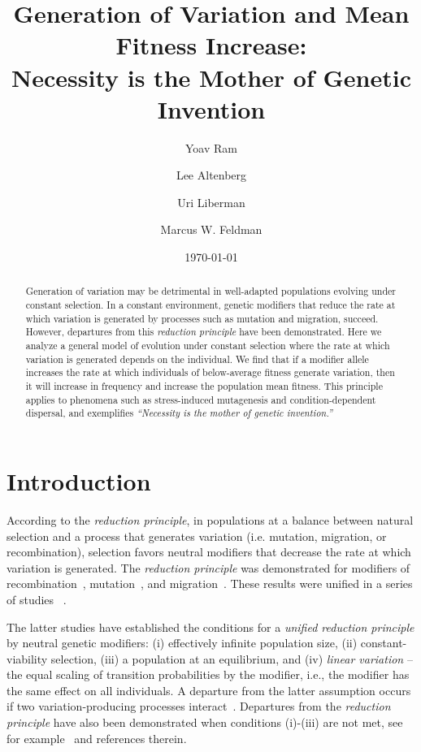 \documentclass[12pt, twocolumn]{extarticle}
\title{Generation of Variation and Mean Fitness Increase: \\ Necessity is the Mother of Genetic Invention}
\author[a]{Yoav Ram}
\author[b]{Lee Altenberg}
\author[c]{Uri Liberman}
\author[a]{Marcus W. Feldman}
\affil[a]{Department of Biology, Stanford University, Stanford, CA}
\affil[b]{Information and Computer Sciences, University of Hawai`i at M{\=a}noa, Honolulu, HI}
\affil[c]{School of Mathematical Sciences, Tel Aviv University, Israel}
\date{\today}
\begin{document}
\maketitle

\begin{abstract}
Generation of variation may be detrimental in well-adapted populations evolving under constant selection.
In a constant environment, genetic modifiers that reduce the rate at which variation is generated by processes such as mutation and migration, succeed.
However, departures from this \emph{reduction principle} have been demonstrated.
Here we analyze a general model of evolution under constant selection where the rate at which variation is generated depends on the individual.
We find that if a modifier allele increases the rate at which individuals of below-average fitness generate variation, then it will increase in frequency and increase the  population mean fitness. This principle applies to phenomena such as stress-induced mutagenesis and condition-dependent dispersal, and exemplifies \emph{``Necessity is the mother of genetic invention.''}
\end{abstract}

\section*{Introduction}

According to the \emph{reduction principle}, in populations at a balance between natural selection and a process that generates variation (i.e. mutation, migration, or recombination), selection favors neutral modifiers that decrease the rate at which variation is generated. 
The \emph{reduction principle} was demonstrated for modifiers of  recombination~\citep{Feldman1972}, mutation~\citep{Liberman1986a}, and migration~\citep{Feldman1986}.
These results were unified in a series of studies ~\citep{Altenberg1984,Altenberg1987,Altenberg2009,Altenberg2012b,Altenberg2012a,Altenberg2017}.

The latter studies have established the conditions for a \emph{unified reduction principle} by neutral genetic modifiers:
(i) effectively infinite population size, (ii) constant-viability selection, (iii) a population at an equilibrium, and (iv) \emph{linear variation} -- the equal scaling of transition probabilities by the modifier, i.e., the modifier has the same effect on all individuals.
A departure from the latter assumption occurs if two variation-producing processes interact~\citep{Feldman1980,Altenberg2012b}.
Departures from the \emph{reduction principle} have also been demonstrated when conditions (i)-(iii) are not met, see for example~\citet{Holsinger1986} and references therein.
\end{document}
